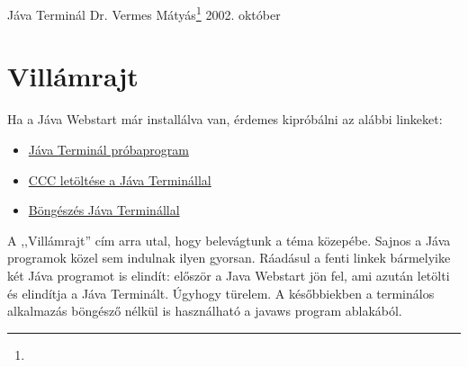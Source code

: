 \def\htmlfigext{\png}
\pagetitle%
{Jáva Terminál}%
{Dr. Vermes Mátyás\footnote{\ComFirm}}%
{2002. október}

\section{Villámrajt}
Ha a Jáva Webstart már installálva van,
érdemes kipróbálni az alábbi linkeket:
\begin{itemize}
\item \href{http://ok.comfirm.hu/jnlp/jtproba.jnlp}{Jáva Terminál próbaprogram}
\item \href{http://ok.comfirm.hu/jnlp/cccdown.jnlp}{CCC letöltése a Jáva Terminállal}
\item \href{http://ok.comfirm.hu/jnlp/browse.jnlp}{Böngészés Jáva Terminállal}
\end{itemize}

A ,,Villámrajt'' cím arra utal, hogy belevágtunk a téma közepébe.
Sajnos a Jáva programok közel sem indulnak ilyen gyorsan.
Ráadásul a fenti linkek bármelyike két Jáva programot is elindít:
először a Java Webstart jön fel, ami azután letölti és elindítja 
a Jáva Terminált. Úgyhogy türelem. A későbbiekben a terminálos
alkalmazás böngésző nélkül is használható a javaws program
ablakából.
 





